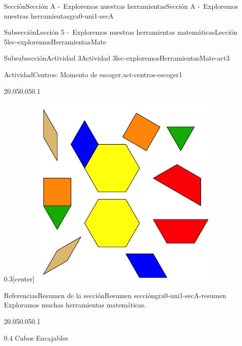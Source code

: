 \documentclass[twoside,10pt,]{article}
\begin{document}
\begin{sectionptx}{Sección}{Sección A -~Exploremos nuestras herramientas}{}{Sección A -~Exploremos nuestras herramientas}{}{}{gra0-uni1-secA}
\begin{subsectionptx}{Subsección}{Lección 5 -~Exploremos nuestras herramientas matemáticas}{}{Lección 5}{}{}{lec-exploremosHerramientasMate}
\begin{subsubsectionptx}{Subsubsección}{Actividad 3}{}{Actividad 3}{}{}{lec-exploremosHerramientasMate-act3}
\begin{activity}{Actividad}{Centros: Momento de escoger.}{act-centros-escoger1}
\begin{sidebyside}{2}{0.05}{0.05}{0.1}
\begin{sbspanel}{0.3}[center]
\includegraphics[width=\linewidth]{external/svg-source/tikz-file-147344.pdf}
\end{sbspanel}%
\end{sidebyside}%
\end{activity}%
\end{subsubsectionptx}
\end{subsectionptx}
%
%
\typeout{************************************************}
\typeout{************************************************}
%
\begin{references-subsection}{Referencias}{Resumen de la sección}{}{Resumen sección}{}{}{gra0-uni1-secA-resumen}
Exploramos muchas herramientas matemáticas.%
\begin{sidebyside}{2}{0.05}{0.05}{0.1}%
\begin{sbspanel}{0.4}%
Cubos Encajables%
\par

\end{sbspanel}
\end{sidebyside}
\end{references-subsection}
\end{sectionptx}
\end{document}
